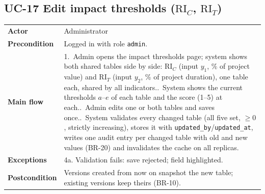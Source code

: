 \documentclass[11pt,a4paper]{article}
\newcommand{\RIC}{\mathrm{RI}_{C}}
\newcommand{\RIT}{\mathrm{RI}_{T}}
\begin{document}
\noindent\begin{minipage}{\linewidth}
\subsection*{UC-17 Edit impact thresholds ($\RIC$, $\RIT$)}
\begin{tabularx}{\linewidth}{@{}>{\raggedright\leavevmode\bfseries\color{creBlue}}p{2.6cm} Y@{}}
\toprule
Actor & Administrator \\
Precondition & Logged in with role \texttt{admin}. \\
Main flow & 1.~Admin opens the impact thresholds page; system shows both shared tables side by side: $\RIC$ (input $y_1$, \% of project value) and $\RIT$ (input $y_2$, \% of project duration), one table each, shared by all indicators..~System shows the current thresholds $a$--$e$ of each table and the score (1--5) at each..~Admin edits one or both tables and saves once..~System validates every changed table (all five set, $\ge 0$, strictly increasing), stores it with \texttt{updated\_by}/\texttt{updated\_at}, writes one audit entry per changed table with old and new values (BR-20) and invalidates the cache on all replicas. \\
Exceptions & 4a. Validation fails: save rejected; field highlighted. \\
Postcondition & Versions created from now on snapshot the new table; existing versions keep theirs (BR-10). \\
\bottomrule
\end{tabularx}
\end{minipage}
\par\medskip
\end{document}
